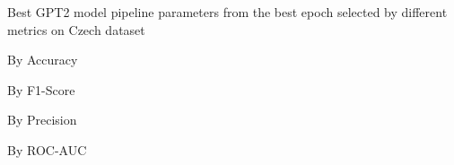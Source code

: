 \begin{table}[!htbp]
    \caption{Best GPT2 model pipeline parameters from the best epoch selected by different metrics on Czech dataset}
    \label{tab:czech_gpt2_pipeline_params}
    \centering

    \begin{subtable}[t]{0.48\linewidth}
        \scriptsize
        \caption{By Accuracy}
        
    \end{subtable}
    \hfill
    \begin{subtable}[t]{0.48\linewidth}
        \scriptsize
        \caption{By F1-Score}
        
    \end{subtable}

    \vspace{1em}

    \begin{subtable}[t]{0.48\linewidth}
        \scriptsize
        \caption{By Precision}
        
    \end{subtable}
    \hfill
    \begin{subtable}[t]{0.48\linewidth}
        \scriptsize
        \caption{By ROC-AUC}
        
    \end{subtable}

\end{table}